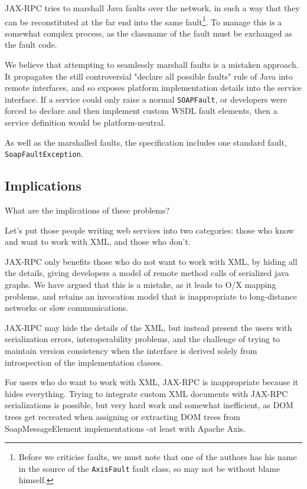 JAX-RPC tries to marshall Java faults over the network, in such a way
that they can be reconstituted at the far end into the same
fault\footnote{Before we criticise faults, we must note that one of
the authors has his name in the source of the {\tt AxisFault} fault
class, so may not be without blame himself.}. To manage this is a
somewhat complex process, as the classname of the fault must be
exchanged as the fault code.

We believe that attempting to seamlessly marshall faults is a mistaken
approach.  It propagates the still controversial "declare all possible
faults" rule of Java into remote interfaces, and so exposes platform
implementation details into the service interface. If a service could
only raise a normal {\tt SOAPFault}, or developers were forced to
declare and then implement custom WSDL fault elements, then a service
definition would be platform-neutral.

As well as the marshalled faults, the specification includes one
standard fault, {\tt SoapFaultException}.

\subsection{Implications}

What are the implications of these problems?

Let's put those people writing web services into two categories: those
who know and want to work with XML, and those who don't. 

JAX-RPC only benefits those who do not want to work with XML, by hiding
all the details, giving developers a model of remote method calls of
serialized java graphs. We have argued that this is a mistake, 
as it leads to O/X mapping problems, and retains an invocation model
that is inappropriate to long-distance networks or slow communications. 

JAX-RPC may hide the details of the XML, but instead present the users
with serialization errors, interoperability problems, and the challenge
of trying to maintain version consistency when the interface is derived
solely from introspection of the implementation classes.


For users who do want to work with XML, JAX-RPC is inappropriate because
it hides everything. Trying to integrate custom XML documents with
JAX-RPC serializations is possible, but very hard work and somewhat
inefficient, as DOM trees get recreated when assigning or extracting DOM
trees from SoapMessageElement implementations -at least with Apache
Axis.


